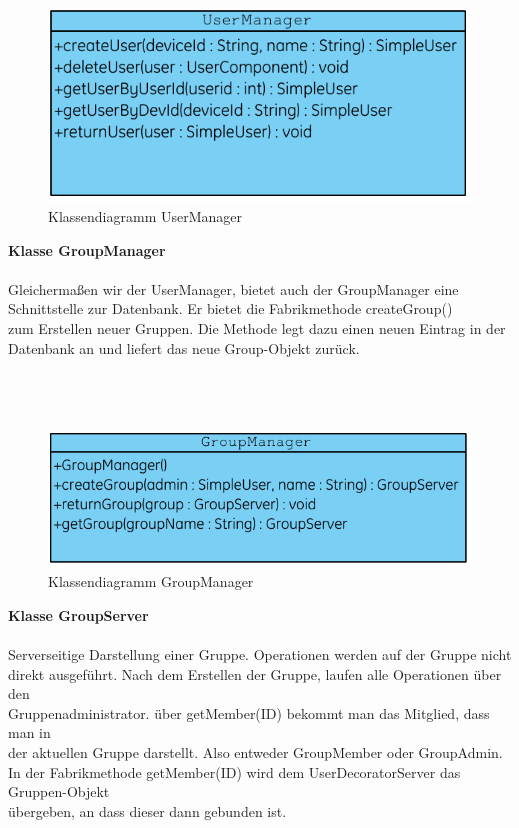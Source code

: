 \begin{figure}[h]
     \centering
     \includegraphics[scale=1.0, trim=1 1 1 1,clip=true]{servergraphs/user-manager.pdf}
     \caption{Klassendiagramm UserManager}
\end{figure}
\clearpage

\textbf{Klasse GroupManager}\\
\\
Gleichermaßen wir der UserManager, bietet auch der GroupManager eine \\
Schnittstelle zur Datenbank. Er bietet die Fabrikmethode createGroup()\\
zum Erstellen neuer Gruppen. Die Methode legt dazu einen neuen Eintrag in der\\
Datenbank an und liefert das neue Group-Objekt zurück.\\ \\ \\ \\

\begin{figure}[h]
     \centering
     \includegraphics[scale=1.0, trim=2 2 2 2, clip=true]{servergraphs/group-manager.pdf}
     \caption{Klassendiagramm GroupManager}
\end{figure}
\clearpage

\textbf{Klasse GroupServer}\\
\\
Serverseitige Darstellung einer Gruppe. Operationen werden auf der Gruppe nicht\\
direkt ausgeführt. Nach dem Erstellen der Gruppe, laufen alle Operationen über den\\
Gruppenadministrator. über getMember(ID) bekommt man das Mitglied, dass man in \\
der aktuellen Gruppe darstellt. Also entweder GroupMember oder GroupAdmin.
In der Fabrikmethode getMember(ID) wird dem UserDecoratorServer das Gruppen-Objekt\\
übergeben, an dass dieser dann gebunden ist.\\ \\


